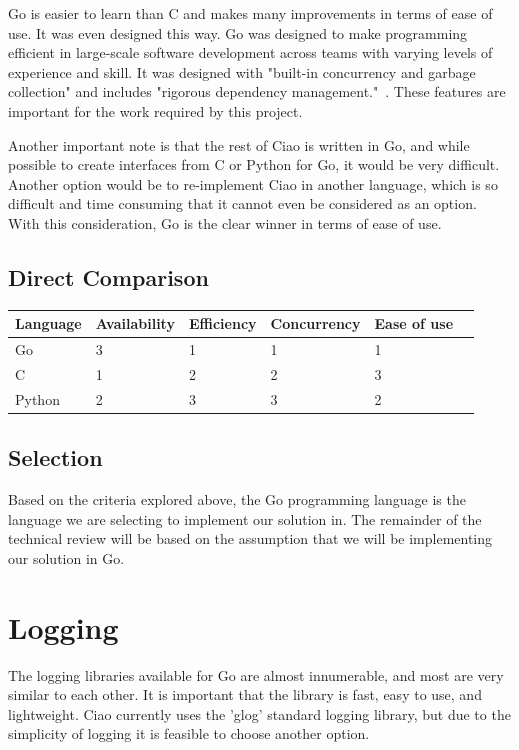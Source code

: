 \documentclass[10pt,letterpaper,onecolumn,journal]{IEEEtran}
\begin{document}
Go is easier to learn than C and makes many improvements in terms of ease of
use. It was even designed this way. Go was designed to make programming
efficient in large-scale software development across teams with varying levels
of experience and skill. It was designed with "built-in concurrency and garbage
collection" and includes "rigorous dependency management."~\cite{godesign}.
These features are important for the work required by this project.

Another important note is that the rest of Ciao is written in Go, and while
possible to create interfaces from C or Python for Go, it would be very
difficult. Another option would be to re-implement Ciao in another language,
which is so difficult and time consuming that it cannot even be considered as an
option. With this consideration, Go is the clear winner in terms of ease of use.

\subsection{Direct Comparison}

\begin{center}
	\begin{tabular}{| l | l | l | l | l | l |}
		\hline
		Language & Availability & Efficiency & Concurrency & Ease of use
		\\ \hline
		Go     & 3 & 1 & 1 & 1 \\ \hline
		C      & 1 & 2 & 2 & 3 \\ \hline
		Python & 2 & 3 & 3 & 2 \\ \hline
	\end{tabular}
\end{center}

\subsection{Selection}

Based on the criteria explored above, the Go programming language is the
language we are selecting to implement our solution in. The remainder of the
technical review will be based on the assumption that we will be implementing
our solution in Go.

\section{Logging}

The logging libraries available for Go are almost innumerable, and most are very
similar to each other. It is important that the library is fast, easy to use,
and lightweight. Ciao currently uses the 'glog' standard logging library, but
due to the simplicity of logging it is feasible to choose another option.
\end{document}

